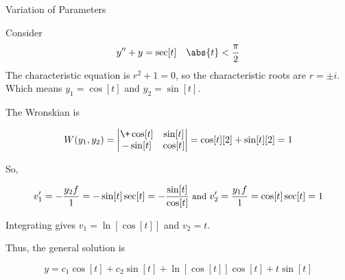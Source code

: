 \documentclass{beamer}
\begin{document}
\begin{frame}{Variation of Parameters}
\begin{example}
Consider
\begin{equation*}
y^{\prime\prime}+y=\sec[t] \quad \abs{t}<\dfrac{\pi}{2}
\end{equation*}\pause
The characteristic equation is $r^2+1=0$, so the characteristic roots are $r=\pm i$. Which means $y_1=\cos[t]$ and $y_2=\sin[t]$.\pause

\vspace{2mm}
The Wronskian is

\vspace{-4mm}
\begin{equation*}
W(y_1, y_2)=
\begin{vmatrix}
\+\cos[t] & \sin[t] \\
 -\sin[t] & \cos[t] \\
\end{vmatrix}
=\cos[t][2]+\sin[t][2]=1
\end{equation*}\pause

\vspace{-6mm}
So,

\vspace{-8mm}
\begin{equation*}
\small
v_1^\prime = -\dfrac{y_2 f}{1} = -\sin[t]\sec[t]=-\dfrac{\sin[t]}{\cos[t]}
\ \text{and}\ 
v_2^\prime = \dfrac{y_1 f}{1} = \cos[t]\sec[t] = 1
\end{equation*}\pause

\vspace{-4mm}
Integrating gives $v_1=\ln[\cos[t]]$ and $v_2=t$.\pause

\vspace{2mm}
Thus, the general solution is

\vspace{-4mm}
\begin{equation*}
y=c_1\cos[t]+c_2\sin[t]+\ln[\cos[t]]\cos[t]+t\sin[t]
\end{equation*}
\end{example}
\end{frame}
\end{document}
